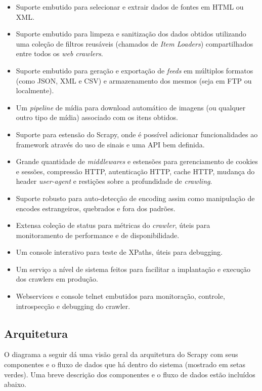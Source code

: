 \begin{itemize}
	\item Suporte embutido para selecionar e extrair dados de fontes em HTML ou XML.
	\item Suporte embutido para limpeza e sanitização dos dados obtidos utilizando uma coleção de filtros reusáveis (chamados de \emph{Item Loaders}) compartilhados entre todos os \emph{web crawlers}.
	\item Suporte embutido para geração e exportação de \emph{feeds} em múltiplos formatos (como JSON, XML e CSV) e armazenamento dos mesmos (seja em FTP ou localmente).
	\item Um \emph{pipeline} de mídia para download automático de imagens (ou qualquer outro tipo de mídia) associado com os itens obtidos.
	\item Suporte para estensão do Scrapy, onde é possível adicionar funcionalidades ao framework através do uso de sinais e uma API bem definida.
	\item Grande quantidade de \emph{middlewares} e estensões para gerenciamento de cookies e sessões, compressão HTTP, autenticação HTTP, cache HTTP, mudança do header \emph{user-agent} e restições sobre a profundidade de \emph{crawling}.
	\item Suporte robusto para auto-detecção de encoding assim como manipulação de encodes estrangeiros, quebrados e fora dos padrões.
	\item Extensa coleção de status para métricas do \emph{crawler}, úteis para monitoramento de performance e de disponibilidade.
	\item Um console interativo para teste de XPaths, úteis para debugging.
	\item Um serviço a nível de sistema feitos para facilitar a implantação e execução dos crawlers em produção.
	\item Webservices e console telnet embutidos para monitoração, controle, introspecção e debugging do crawler.
\end{itemize}

\subsection{Arquitetura}

O diagrama a seguir dá uma visão geral da arquitetura do Scrapy com seus componentes e o fluxo de dados que há dentro do sistema (mostrado em setas verdes). Uma breve descrição dos componentes e o fluxo de dados estão incluídos abaixo.

